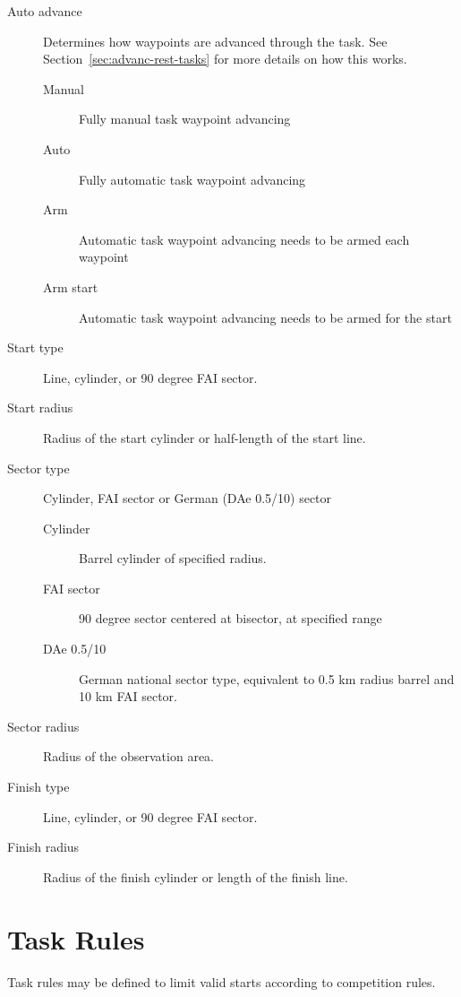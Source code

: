 \documentclass[a4paper,12pt]{refrep}
\begin{document}
\begin{description}
\item[Auto advance]  Determines how waypoints are advanced through the task.
 See Section~\ref{sec:advanc-rest-tasks} for more details on how this
 works.
\begin{description}
\item[Manual] Fully manual task waypoint advancing
\item[Auto] Fully automatic task waypoint advancing
\item[Arm] Automatic task waypoint advancing needs to be armed each waypoint
\item[Arm start] Automatic task waypoint advancing needs to be armed for the start
\end{description}
\item[Start type]  Line, cylinder, or 90 degree FAI sector.
\item[Start radius]  Radius of the start cylinder or half-length of the 
  start line.
\item[Sector type]  Cylinder, FAI sector or German (DAe 0.5/10) sector
\begin{description}
\item[Cylinder]  Barrel cylinder of specified radius.
\item[FAI sector]  90 degree sector centered at bisector, at specified range
\item[DAe 0.5/10] German national sector type, equivalent to 0.5 km radius barrel and 10 km FAI sector.
\end{description}
\item[Sector radius]  Radius of the observation area.
\item[Finish type]  Line, cylinder, or 90 degree FAI sector.
\item[Finish radius]  Radius of the finish cylinder or length of the 
  finish line.

\end{description}

\clearpage
\section{Task Rules}
Task rules may be defined to limit valid starts according to competition
rules.
\end{document}
